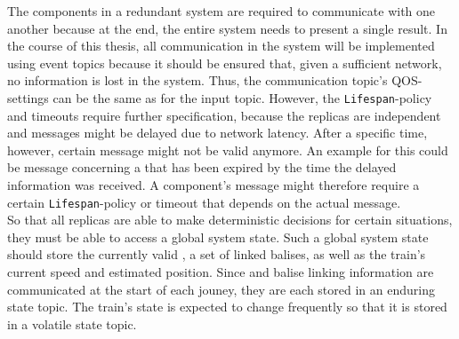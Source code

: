 The components in a redundant system are required to communicate with one another because at the end, the entire system needs to present a single result.
In the course of this thesis, all communication in the system will be implemented using  event topics because it should be ensured that, given a sufficient network, no information is lost in the system.
Thus, the communication topic's \gls*{QOS}-settings can be the same as for the input topic.
However, the \texttt{Lifespan}-policy and timeouts require further specification, because the replicas are independent and messages might be delayed due to network latency.
After a specific time, however, certain message might not be valid anymore.
An example for this could be message concerning a  that has been expired by the time the delayed information was received.
A component's message might therefore require a certain \texttt{Lifespan}-policy or timeout that depends on the actual message.
\\

So that all replicas are able to make deterministic decisions for certain situations, they must be able to access a global system state.
Such a global system state should store the currently valid , a set of linked balises, as well as the train's current speed and estimated position.
Since  and balise linking information are communicated at the start of each jouney, they are each stored in an enduring  state topic.
The train's state is expected to change frequently so that it is stored in a volatile  state topic.